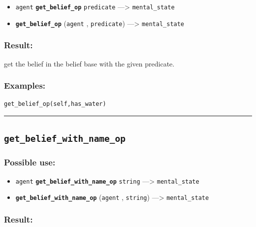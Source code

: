 \documentclass[]{book}
\providecommand{\tightlist}{%
  \setlength{\itemsep}{0pt}\setlength{\parskip}{0pt}}
\theoremstyle{definition}
\theoremstyle{definition}
\theoremstyle{definition}
\theoremstyle{remark}
\begin{document}
\begin{itemize}
\tightlist
\item
  \texttt{agent} \textbf{\texttt{get\_belief\_op}} \texttt{predicate}
  ---\textgreater{} \texttt{mental\_state}
\item
  \textbf{\texttt{get\_belief\_op}} (\texttt{agent} ,
  \texttt{predicate}) ---\textgreater{} \texttt{mental\_state}
\end{itemize}

\subsubsection{Result:}\label{result-191}

get the belief in the belief base with the given predicate.

\subsubsection{Examples:}\label{examples-144}

\begin{verbatim}
get_belief_op(self,has_water) 
\end{verbatim}

\begin{center}\rule{0.5\linewidth}{\linethickness}\end{center}

\subsection{\texorpdfstring{\texttt{get\_belief\_with\_name\_op}}{get\_belief\_with\_name\_op}}\label{get_belief_with_name_op}

\subsubsection{Possible use:}\label{possible-use-198}

\begin{itemize}
\tightlist
\item
  \texttt{agent} \textbf{\texttt{get\_belief\_with\_name\_op}}
  \texttt{string} ---\textgreater{} \texttt{mental\_state}
\item
  \textbf{\texttt{get\_belief\_with\_name\_op}} (\texttt{agent} ,
  \texttt{string}) ---\textgreater{} \texttt{mental\_state}
\end{itemize}

\subsubsection{Result:}\label{result-192}
\end{document}
